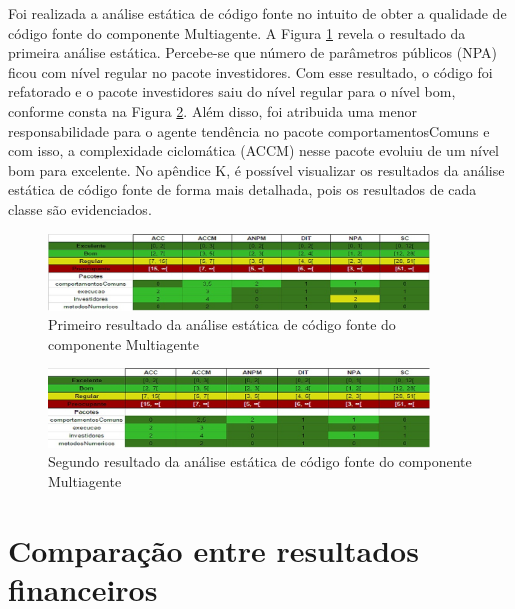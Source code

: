 Foi realizada a análise estática de código fonte no intuito de obter a qualidade de código fonte do componente Multiagente. A Figura \ref{analiseinicial} revela o resultado da primeira análise estática. Percebe-se que número de parâmetros públicos (NPA) ficou com nível regular no pacote investidores. Com esse resultado, o código foi refatorado e o pacote investidores saiu do nível regular para o nível bom, conforme consta na Figura \ref{analisefinal}. Além disso, foi atribuida uma menor responsabilidade para o agente tendência no pacote comportamentosComuns e com isso, a complexidade ciclomática (ACCM) nesse pacote evoluiu de um nível bom para excelente. No apêndice K, é possível visualizar os resultados da análise estática de código fonte de forma mais detalhada, pois os resultados de cada classe são evidenciados.

\begin{figure}[H]
\centering
\includegraphics[width=0.9\textwidth]{figuras/analiseinicial}
\caption{Primeiro resultado da análise estática de código fonte do componente Multiagente}
\label{analiseinicial}
\end{figure}

\begin{figure}[H]
\centering
\includegraphics[width=0.9\textwidth]{figuras/analisefinal}
\caption{Segundo resultado da análise estática de código fonte do componente Multiagente}
\label{analisefinal}
\end{figure}

\section{Comparação entre resultados financeiros}
